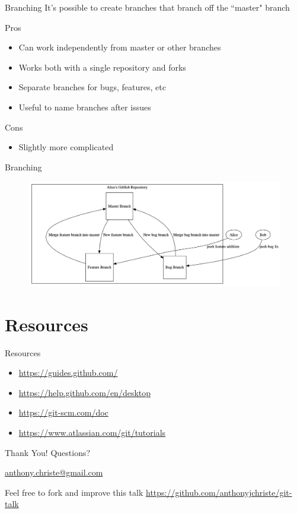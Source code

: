 \documentclass{beamer}
\begin{document}
    \begin{frame}{Branching}
        It's possible to create branches that branch off the ``master" branch

        Pros
        \begin{itemize}
            \item Can work independently from master or other branches
            \item Works both with a single repository and forks
            \item Separate branches for bugs, features, etc
            \item Useful to name branches after issues
        \end{itemize}

        Cons
        \begin{itemize}
            \item Slightly more complicated
        \end{itemize}
    \end{frame}

    \begin{frame}{Branching}
        \begin{figure}
            \centering
            \includegraphics[width=\textwidth]{figures/branch.png}
        \end{figure}
    \end{frame}

    \section{Resources}\label{sec:resources}
    \begin{frame}{Resources}
        \begin{itemize}
            \item \url{https://guides.github.com/}
            \item \url{https://help.github.com/en/desktop}
            \item \url{https://git-scm.com/doc}
            \item \url{https://www.atlassian.com/git/tutorials}
        \end{itemize}
    \end{frame}

    \begin{frame}{Thank You!}
        \centering
        Questions?

        \href{mailto:anthony.christe@gmail.com}{anthony.christe@gmail.com}

        Feel free to fork and improve this talk \url{https://github.com/anthonyjchriste/git-talk}
    \end{frame}
\end{document}
